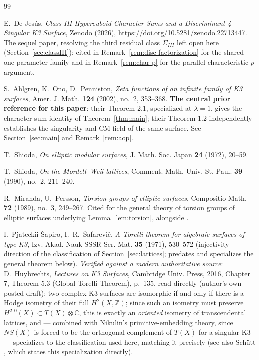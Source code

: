 \documentclass[11pt]{amsart}
\theoremstyle{definition}
\begin{document}
\begin{thebibliography}{99}

E.~De Jes\'us, \emph{Class III Hypercuboid Character Sums and a Discriminant-4 Singular K3 Surface}, Zenodo (2026), \url{https://doi.org/10.5281/zenodo.22713447}. The sequel paper, resolving the third residual class $\Sigma_{III}$ left open here (Section~\ref{sec:classIII}); cited in Remark~\ref{rem:disc-factorization} for the shared one-parameter family and in Remark~\ref{rem:char-p} for the parallel characteristic-$p$ argument.

S.~Ahlgren, K.~Ono, D.~Penniston, \emph{Zeta functions of an infinite family of K3 surfaces}, Amer. J. Math. \textbf{124} (2002), no.~2, 353--368. \textbf{The central prior reference for this paper}: their Theorem 2.1, specialized at $\lambda=1$, gives the character-sum identity of Theorem~\ref{thm:main}; their Theorem 1.2 independently establishes the singularity and CM field of the same surface. See Section~\ref{sec:main} and Remark~\ref{rem:aop}.

T.~Shioda, \emph{On elliptic modular surfaces}, J. Math. Soc. Japan \textbf{24} (1972), 20--59.

T.~Shioda, \emph{On the Mordell--Weil lattices}, Comment. Math. Univ. St. Paul. \textbf{39} (1990), no.~2, 211--240.

R.~Miranda, U.~Persson, \emph{Torsion groups of elliptic surfaces}, Compositio Math. \textbf{72} (1989), no.~3, 249--267. Cited for the general theory of torsion groups of elliptic surfaces underlying Lemma~\ref{lem:torsion}, alongside \cite{Shioda1990}.

I.~Pjateckii-\v{S}apiro, I.~R.~\v{S}afarevi\v{c}, \emph{A Torelli theorem for algebraic surfaces of type K3}, Izv. Akad. Nauk SSSR Ser. Mat. \textbf{35} (1971), 530--572 (injectivity direction of the classification of Section~\ref{sec:lattices}; predates and specializes the general theorem below). \emph{Verified against a modern authoritative source}: D.~Huybrechts, \emph{Lectures on K3 Surfaces}, Cambridge Univ. Press, 2016, Chapter 7, Theorem 5.3 (Global Torelli Theorem), p.~135, read directly (author's own posted draft): two complex K3 surfaces are isomorphic if and only if there is a Hodge isometry of their full $H^2(X,\mathbb Z)$; since such an isometry must preserve $H^{2,0}(X)\subset T(X)\otimes\mathbb C$, this is exactly an \emph{oriented} isometry of transcendental lattices, and — combined with Nikulin's primitive-embedding theory, since $NS(X)$ is forced to be the orthogonal complement of $T(X)$ for a singular K3 — specializes to the classification used here, matching it precisely (see also Sch\"utt \cite{Schutt2010}, which states this specialization directly).


\end{thebibliography}
\end{document}
